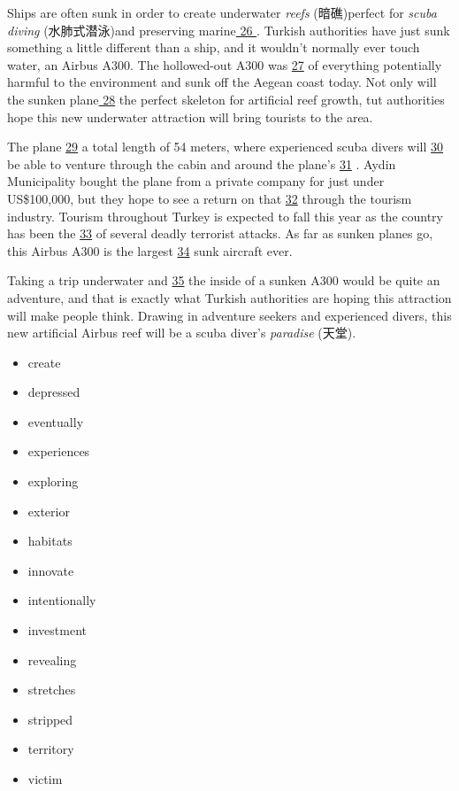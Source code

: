 \documentclass[UTF8,11pt]{ctexart}
\begin{document}
Ships are often sunk in order to create underwater\textit{ reefs} (暗礁)perfect for\textit{ scuba diving} (水肺式潜泳)and preserving marine\uline{ 26 }. Turkish authorities have just sunk something a little different than a ship, and it wouldn’t normally ever touch water, an Airbus A300. The hollowed-out A300 was \uline{27} of everything potentially harmful to the environment and sunk off the Aegean coast today. Not only will the sunken plane\uline{ 28} the perfect skeleton for artificial reef growth, tut authorities hope this new underwater attraction will bring tourists to the area.


The plane \uline{29} a total length of 54 meters, where experienced scuba divers will \uline{30} be able to venture through the cabin and around the plane’s \uline{31} . Aydin Municipality bought the plane from a private company for just under US\$100,000, but they hope to see a return on that \uline{32} through the tourism industry. Tourism throughout Turkey is expected to fall this year as the country has been the \uline{33} of several deadly terrorist attacks. As far as sunken planes go, this Airbus A300 is the largest \uline{34} sunk aircraft ever.


Taking a trip underwater and \uline{35} the inside of a sunken A300 would be quite an adventure, and that is exactly what Turkish authorities are hoping this attraction will make people think. Drawing in adventure seekers and experienced divers, this new artificial Airbus reef will be a scuba diver’s\textit{ paradise} (天堂).


\begin{itemize}[leftmargin=2em,itemsep=.2em,topsep=.4em]\item[A.] create
\item[B.] depressed
\item[C.] eventually
\item[D.] experiences
\item[E.] exploring
\item[F.] exterior
\item[G.] habitats
\item[H.] innovate
\item[I.] intentionally
\item[J.] investment
\item[K.] revealing
\item[L.] stretches
\item[M.] stripped
\item[N.] territory
\item[O.] victim
\end{itemize}
\end{document}
